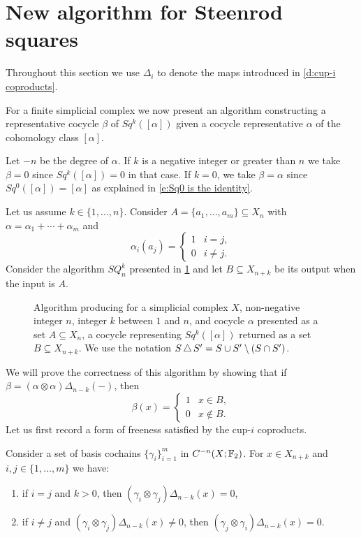 
\section{New algorithm for Steenrod squares} \label{s:algorithm}

Throughout this section we use $\Delta_i$ to denote the maps introduced in \cref{d:cup-i coproducts}.

For a finite simplicial complex we now present an algorithm constructing a representative cocycle $\beta$ of $Sq^k([\alpha])$ given a cocycle representative $\alpha$ of the cohomology class $[\alpha]$.

Let $-n$ be the degree of $\alpha$.
If $k$ is a negative integer or greater than $n$ we take $\beta = 0$ since $Sq^k([\alpha]) = 0$ in that case.
If $k = 0$, we take $\beta = \alpha$ since $Sq^0([\alpha]) = [\alpha]$ as explained in \cref{e:Sq0 is the identity}.

Let us assume $k \in \{1, \dots, n\}$.
Consider $A = \{a_1, \dots, a_m\} \subseteq X_n$ with $\alpha = \alpha_1 + \cdots + \alpha_m$ and
\begin{equation*}
\alpha_i(a_j) = \begin{cases}
1 & i=j, \\ 0 & i\neq j.
\end{cases}
\end{equation*}
Consider the algorithm $SQ_n^k$ presented in \cref{f:algorithm} and let $B \subseteq X_{n+k}$ be its output when the input is $A$.
\begin{figure}
	
	\caption{Algorithm producing for a simplicial complex $X$, non-negative integer $n$, integer $k$ between $1$ and $n$, and cocycle $\alpha$ presented as a set $A \subseteq X_n$, a cocycle representing $Sq^k([\alpha])$ returned as a set $B \subseteq X_{n+k}$.
	We use the notation $S \operatorname{\triangle} S^\prime = S \cup S^\prime \setminus (S \cap S^\prime)$.}
	\label{f:algorithm}
\end{figure}

We will prove the correctness of this algorithm by showing that if $\beta = (\alpha \otimes \alpha)\Delta_{n-k}(-)$, then
\begin{equation*}
\beta(x) =
\begin{cases}
1 & x \in B, \\
0 & x \not\in B.
\end{cases}
\end{equation*}
Let us first record a form of freeness satisfied by the cup-$i$ coproducts.

\begin{lemma} \label{l:freeness}
	Consider a set of basis cochains $\{\gamma_i\}_{i=1}^m$ in $C^{-n}(X; \mathbb{F}_2)$. For $x \in X_{n+k}$ and $i, j \in \{1,\dots,m\}$ we have:
	\begin{enumerate}
		\item if $i=j$ and $k>0$, then $(\gamma_i \otimes \gamma_j)\Delta_{n-k}(x) = 0$,
		\item if $i \neq j$ and $(\gamma_i \otimes \gamma_j)\Delta_{n-k}(x) \neq 0$, then $(\gamma_j \otimes \gamma_i)\Delta_{n-k}(x) = 0$.
	\end{enumerate}
\end{lemma}

